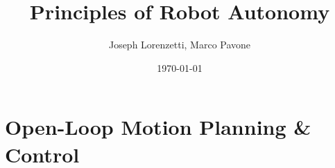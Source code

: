 \documentclass[nohyper,nobib]{tufte-book}
\title{Principles of Robot Autonomy}
\author{Joseph Lorenzetti, Marco Pavone}
\date{\today}
\begin{document}
\chapter{Open-Loop Motion Planning \& Control}


\printbibliography
\end{document}
